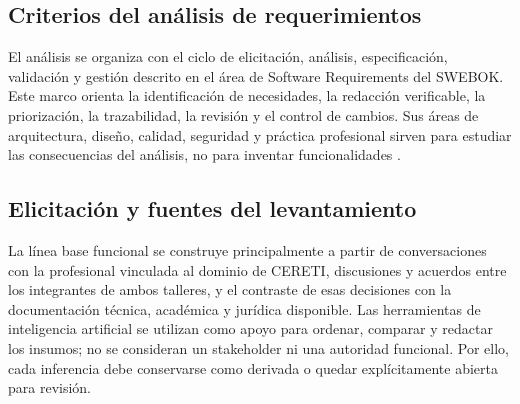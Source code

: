 \documentclass[10pt,a4paper,oneside]{article}
\begin{document}
\subsection{Criterios del análisis de requerimientos}

El análisis se organiza con el ciclo de elicitación, análisis, especificación, validación y gestión descrito en el área de Software Requirements del SWEBOK. Este marco orienta la identificación de necesidades, la redacción verificable, la priorización, la trazabilidad, la revisión y el control de cambios. Sus áreas de arquitectura, diseño, calidad, seguridad y práctica profesional sirven para estudiar las consecuencias del análisis, no para inventar funcionalidades \citep{swebok}.

\subsection{Elicitación y fuentes del levantamiento}

La línea base funcional se construye principalmente a partir de conversaciones con la profesional vinculada al dominio de CERETI, discusiones y acuerdos entre los integrantes de ambos talleres, y el contraste de esas decisiones con la documentación técnica, académica y jurídica disponible. Las herramientas de inteligencia artificial se utilizan como apoyo para ordenar, comparar y redactar los insumos; no se consideran un stakeholder ni una autoridad funcional. Por ello, cada inferencia debe conservarse como derivada o quedar explícitamente abierta para revisión.

\begin{center}
\end{center}
\end{document}
